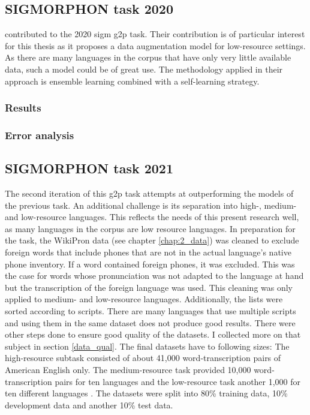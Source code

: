 \subsection{SIGMORPHON task 2020}
\label{sig20}

\citet{yu-etal-2020} contributed to the 2020 \ac{sigm} \ac{g2p} task. Their contribution is of particular interest for this thesis as it proposes a data augmentation model for low-resource settings. As there are many languages in the corpus that have only very little available data, such a model could be of great use. The methodology applied in their approach is ensemble learning combined with a self-learning strategy. 


\subsubsection*{Results}

  
\subsubsection*{Error analysis}


\subsection{SIGMORPHON task 2021}
\label{sig21}
The second iteration of this \ac{g2p} task attempts at outperforming the models of the previous task. An additional challenge is its separation into high-, medium- and low-resource languages. This reflects the needs of this present research well, as many languages in the corpus are low resource languages. In preparation for the task, the WikiPron data (see chapter \ref{chap:2_data}) was cleaned to exclude foreign words that include phones that are not in the actual language's native phone inventory. If a word contained foreign phones, it was excluded. This was the case for words whose pronunciation was not adapted to the language at hand but the transcription of the foreign language was used. This cleaning was only applied to medium- and low-resource languages. Additionally, the lists were sorted according to scripts. There are many languages that use multiple scripts and using them in the same dataset does not produce good results. There were other steps done to ensure good quality of the datasets. I collected more on that subject in section \ref{data_qual}. 
The final datasets have to following sizes: The high-resource subtask consisted of about 41,000 word-transcription pairs of American English only. The medium-resource task provided 10,000 word-transcription pairs for ten languages and the low-resource task another 1,000 for ten different languages \citep{Ashby&Bartley.2021}. The datasets were split into 80\% training data, 10\% development data and another 10\% test data. 

